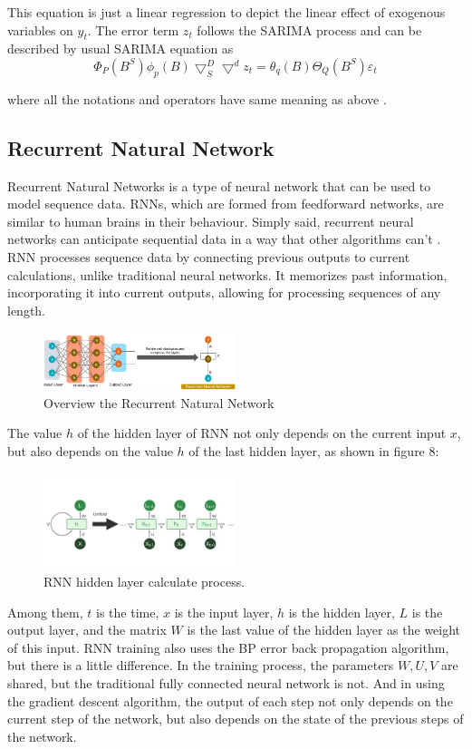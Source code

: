 \documentclass{ieeeojies}
\begin{document}
This equation is just a linear regression to depict the linear effect of exogenous variables on $y_t$. The error term $z_t$ follows the SARIMA process and can be described by usual SARIMA equation as
\begin{equation}
    \Phi_P(B^S)\phi_p(B)\bigtriangledown_S^D\bigtriangledown^dz_t = \theta_q(B)\Theta_Q(B^S)\varepsilon_t
\end{equation}

where all the notations and operators have same meaning as above \cite{b4}.
\subsection{Recurrent Natural Network}
Recurrent Natural Networks is a type of neural network that can be used to model sequence data. RNNs, which are formed from feedforward networks, are similar to human brains in their behaviour. Simply said, recurrent neural networks can anticipate sequential data in a way that other algorithms can’t \cite{b10}. RNN processes sequence data by connecting previous outputs to current calculations, unlike traditional neural networks. It memorizes past information, incorporating it into current outputs, allowing for processing sequences of any length.
\begin{figure} [H]
    \centering
    \includegraphics[width=0.5\textwidth]{bibliography/Figure/RNN_overview.png}
    \caption{Overview the Recurrent Natural Network}
    \label{fig:rnn-overview}
\end{figure}

The value $h$ of the hidden layer of RNN not only depends on the current input $x$, but also depends on the value $h$ of the last hidden layer, as shown in figure 8:
\begin{figure} [H]
    \centering
    \includegraphics[width=0.5\textwidth]{bibliography/Figure/What-is-Recurrent-Neural-Network.jpg}
    \caption{RNN hidden layer calculate process.}
    \label{fig:rnn-hidden-layer}
\end{figure}
Among them, $t$ is the time, $x$ is the input layer, $h$ is the hidden layer, $L$ is the output layer, and the matrix $W$ is the last value of the hidden layer as the weight of this input. RNN training also uses the BP error back propagation algorithm, but there is a little difference. In the training process, the parameters $W, U, V$ are shared, but the traditional fully connected neural network is not. And in using the gradient descent algorithm, the output of each step not only depends on the current step of the network, but also depends on the state of the previous steps of the network.
\end{document}
